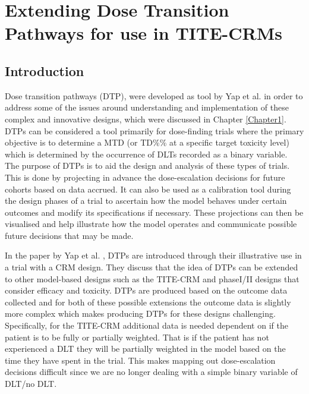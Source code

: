 
\chapter{Extending Dose Transition Pathways for use in TITE-CRMs} %

\label{TITE-DTP} %


\section{Introduction}
\label{tite-dtp:Introduction}

Dose transition pathways (DTP), were developed as tool by Yap et al. \cite{yapDoseTransitionPathways2017} in order to address some of the issues around understanding and implementation of these complex and innovative designs, which were discussed in Chapter \ref{Chapter1}. DTPs can be considered a tool primarily for dose-finding trials where the primary objective is to determine a MTD (or TD\%\% at a specific target toxicity level) which is determined by the occurrence of DLTs recorded as a binary variable. The purpose of DTPs is to aid the design and analysis of these types of trials. This is done by projecting in advance the dose-escalation decisions for future cohorts based on data accrued. It can also be used as a calibration tool during the design phases of a trial to ascertain how the model behaves under certain outcomes and modify its specifications if necessary. These projections can then be visualised and help illustrate how the model operates and communicate possible future decisions that may be made. 

In the paper by Yap et al. \cite{yapDoseTransitionPathways2017}, DTPs are introduced through their illustrative use in a trial with a CRM design. They discuss that the idea of DTPs can be extended to other model-based designs such as the TITE-CRM and phase\RN{1}/\RN{2} designs that consider efficacy and toxicity. DTPs are produced based on the outcome data collected and for both of these possible extensions the outcome data is slightly more complex which makes producing DTPs for these designs challenging. Specifically, for the TITE-CRM additional data is needed dependent on if the patient is to be fully or partially weighted. That is if the patient has not experienced a DLT they will be partially weighted in the model based on the time they have spent in the trial. This makes mapping out dose-escalation decisions difficult since we are no longer dealing with a simple binary variable of DLT/no DLT. 

